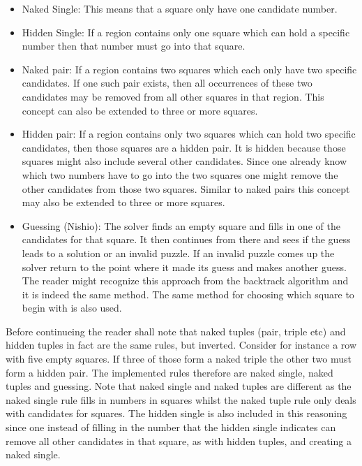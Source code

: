 \documentclass[a4paper,11pt]{kth-mag}
\begin{document}
\begin{itemize}
    \item Naked Single: 
    This means that a square only have one candidate number.
    \item Hidden Single: 
    If a region contains only one square which can hold a specific number then that number must go into that square.
    \item Naked pair:
    If a region contains two squares which each only have two specific candidates.
If one such pair exists, then all occurrences of these two candidates may be removed from all other squares in that region.
This concept can also be extended to three or more squares.
    \item Hidden pair:
    If a region contains only two squares which can hold two specific candidates, then those squares are a hidden pair.
It is hidden because those squares might also include several other candidates.
Since one already know which two numbers have to go into the two squares one might remove the other candidates from those two squares.
Similar to naked pairs this concept may also be extended to three or more squares.

    \item Guessing (Nishio):
    The solver finds an empty square and fills in one of the candidates for that square.
    It then continues from there and sees if the guess leads to a solution or an invalid puzzle.
    If an invalid puzzle comes up the solver return to the point where it made its guess and makes another guess.
    The reader might recognize this approach from the backtrack algorithm and it is indeed the same method.
    The same method for choosing which square to begin with is also used.
\end{itemize}

Before continueing the reader shall note that naked tuples (pair, triple etc) and hidden tuples in fact are the same rules, but inverted.
Consider for instance a row with five empty squares.
If three of those form a naked triple the other two must form a hidden pair.
The implemented rules therefore are naked single, naked tuples and guessing.
Note that naked single and naked tuples are different as the naked single rule fills in numbers in squares whilst the naked tuple rule only deals with candidates for squares.
The hidden single is also included in this reasoning since one instead of filling in the number that the hidden single indicates can remove all other candidates in that square, as with hidden tuples, and creating a naked single.
\end{document}

